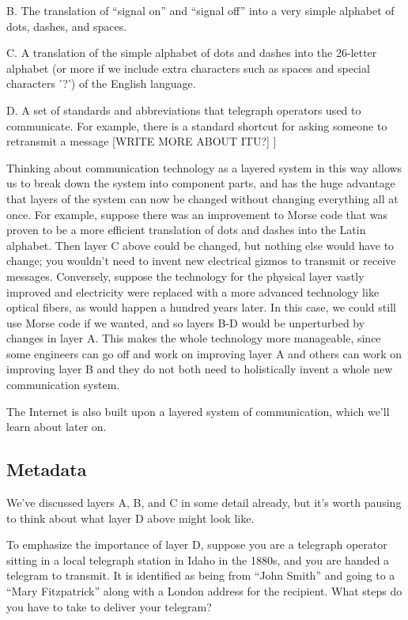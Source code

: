 \documentclass[UTF8]{book}
\begin{document}
\begin{CJK}{UTF8}{gbsn}
B. The translation of “signal on” and “signal off” into a very simple alphabet of dots, dashes, and spaces.

C. A translation of the simple alphabet of dots and dashes into the 26-letter alphabet (or more if we include extra characters such as spaces and special characters '?') of the English language.

D. A set of standards and abbreviations that telegraph operators used to communicate. For example, there is a standard shortcut for asking someone to retransmit a message [WRITE MORE ABOUT ITU?]
]

Thinking about communication technology as a layered system in this way allows us to break down the system into component parts, and has the huge advantage that layers of the system can now be changed without changing everything all at once. For example, suppose there was an improvement to Morse code that was proven to be a more efficient translation of dots and dashes into the Latin alphabet. Then layer C above could be changed, but nothing else would have to change; you wouldn't need to invent new electrical gizmos to transmit or receive messages. Conversely, suppose the technology for the physical layer vastly improved and electricity were replaced with a more advanced technology like optical fibers, as would happen a hundred years later. In this case, we could still use Morse code if we wanted, and so layers B-D would be unperturbed by changes in layer A. This makes the whole technology more manageable, since some engineers can go off and work on improving layer A and others can work on improving layer B and they do not both need to holistically invent a whole new communication system.

The Internet is also built upon a layered system of communication, which we'll learn about later on.

\subsection{Metadata}

We've discussed layers A, B, and C in some detail already, but it's worth pausing to think about what layer D above might look like.

To emphasize the importance of layer D, suppose you are a telegraph operator sitting in a local telegraph station in Idaho in the 1880s, and you are handed a telegram to transmit. It is identified as being from ``John Smith'' and going to a ``Mary Fitzpatrick'' along with a London address for the recipient. What steps do you have to take to deliver your telegram?


\end{CJK}
\end{document}
